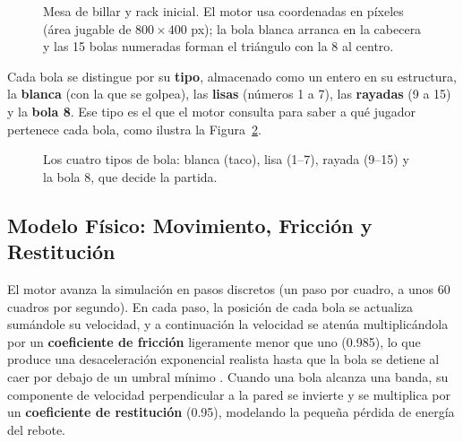 \documentclass[a4paper,12pt]{article}
\newcommand{\bolaR}{0.30}
\newcommand{\bolaBlanca}[2]{%
  \shade[ball color=white] (#1,#2) circle (\bolaR);
  \draw[gray!55, line width=0.4pt] (#1,#2) circle (\bolaR);
}
\newcommand{\bolaSolida}[4]{%
  \shade[ball color=#3] (#1,#2) circle (\bolaR);
  \fill[white] (#1,#2) circle (0.135);
  \node[font=\tiny\bfseries, text=black, inner sep=0] at (#1,#2) {#4};
}
\newcommand{\bolaRayada}[4]{%
  \begin{scope}
    \shade[ball color=white] (#1,#2) circle (\bolaR);
    \clip (#1,#2) circle (\bolaR);
    \shade[ball color=#3] (#1,#2) ellipse (0.34 and 0.15);
  \end{scope}
  \fill[white] (#1,#2) circle (0.135);
  \node[font=\tiny\bfseries, text=black, inner sep=0] at (#1,#2) {#4};
}
\newcommand{\bolaOcho}[2]{%
  \shade[ball color=black!92] (#1,#2) circle (\bolaR);
  \fill[white] (#1,#2) circle (0.135);
  \node[font=\tiny\bfseries, text=black, inner sep=0] at (#1,#2) {8};
}
\begin{document}
\begin{figure}[H]
{%
}
\caption{Mesa de billar y rack inicial. El motor usa coordenadas en píxeles (área jugable de $800\times400$ px); la bola blanca arranca en la cabecera y las 15 bolas numeradas forman el triángulo con la 8 al centro.}
\label{fig:mesa}
\end{figure}

Cada bola se distingue por su \textbf{tipo}, almacenado como un entero en su estructura, la \textbf{blanca} (con la que se golpea), las \textbf{lisas} (números 1 a 7), las \textbf{rayadas} (9 a 15) y la \textbf{bola 8}. Ese tipo es el que el motor consulta para saber a qué jugador pertenece cada bola, como ilustra la Figura~\ref{fig:bolas}.

\begin{figure}[H]
\centering
{}
\caption{Los cuatro tipos de bola: blanca (taco), lisa (1--7), rayada (9--15) y la bola 8, que decide la partida.}
\label{fig:bolas}
\end{figure}

\subsection{Modelo Físico: Movimiento, Fricción y Restitución}
El motor avanza la simulación en pasos discretos (un paso por cuadro, a unos 60 cuadros por segundo). En cada paso, la posición de cada bola se actualiza sumándole su velocidad, y a continuación la velocidad se atenúa multiplicándola por un \textbf{coeficiente de fricción} ligeramente menor que uno (\num{0.985}), lo que produce una desaceleración exponencial realista hasta que la bola se detiene al caer por debajo de un umbral mínimo \cite{patterson2016computer}. Cuando una bola alcanza una banda, su componente de velocidad perpendicular a la pared se invierte y se multiplica por un \textbf{coeficiente de restitución} (\num{0.95}), modelando la pequeña pérdida de energía del rebote.
\end{document}

